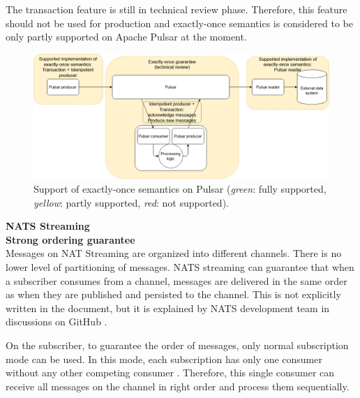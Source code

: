 The transaction feature is still in technical review phase. Therefore, this feature should not be used for production and exactly-once semantics is considered to be only partly supported on Apache Pulsar at the moment.


\begin{figure}[h]
	\centering
	\includegraphics[width=\linewidth]{images/exactly-once-pulsar.png}
	\caption{Support of exactly-once semantics on Pulsar (\emph{green}: fully supported, \emph{yellow}: partly supported, \emph{red}: not supported).}
	\label{fig:exactlyoncepulsar}
\end{figure}




\large \textbf{NATS Streaming}\\
\normalsize
\textbf{Strong ordering guarantee}\\
Messages on NAT Streaming are organized into different channels. There is no lower level of partitioning of messages. NATS streaming can guarantee that when a subscriber consumes from a channel, messages are delivered in the same order as when they are published and persisted to the channel. This is not explicitly written in the document, but it is explained by NATS development team in discussions on GitHub \cite{natsorder}.

On the subscriber, to guarantee the order of messages, only normal subscription mode can be used. In this mode, each subscription has only one consumer without any other competing consumer \cite{natssubscription}. Therefore, this single consumer can receive all messages on the channel in right order and process them sequentially.

